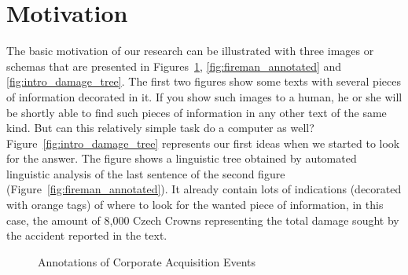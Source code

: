 \section{Motivation}
The basic motivation of our research can be illustrated with three images or schemas that are presented in Figures~\ref{fig:acquisitions_annotated}, \ref{fig:fireman_annotated} and \ref{fig:intro_damage_tree}. The first two figures show some texts with several pieces of information decorated in it. If you show such images to a human, he or she will be shortly able to find such pieces of information in any other text of the same kind. But can this relatively simple task do a computer as well? Figure~\ref{fig:intro_damage_tree} represents our first ideas when we started to look for the answer. The figure shows a linguistic tree obtained by automated linguistic analysis of the last sentence of the second figure (Figure~\ref{fig:fireman_annotated}). It already contain lots of indications (decorated with orange tags) of where to look for the wanted piece of information, in this case, the amount of 8,000 Czech Crowns representing the total damage sought by the accident reported in the text.


\begin{figure}
\centering
{}
\caption{Annotations of Corporate Acquisition Events}
\label{fig:acquisitions_annotated}
\end{figure}


